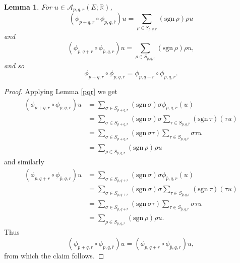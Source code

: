 \documentclass{article}
\newcommand{\sgn}{\mathrm{sgn}\,}
\newtheorem{lemma}[theorem]{Lemma}
\theoremstyle{definition}
\begin{document}
\begin{lemma}
For $u \in \mathscr{A}_{p,q,r}(E;\mathbb{R})$,
\[
(\phi_{p+q,r} \circ \phi_{p,q,\overline{r}})u = \sum_{\rho \in S_{p,q,r}} (\sgn \rho) \rho u
\]
and
\[
(\phi_{p,q+r} \circ \phi_{\overline{p},q,r})u = \sum_{\rho \in S_{p,q,r}} (\sgn \rho) \rho u,
\]
and so
\[
\phi_{p+q,r} \circ \phi_{p,q,\overline{r}} = \phi_{p,q+r} \circ \phi_{\overline{p},q,r}.
\]
\label{associative}
\end{lemma}
\begin{proof}
Applying Lemma \ref{pqr} we get
\begin{align*}
(\phi_{p+q,r} \circ \phi_{p,q,\overline{r}})u&=\sum_{\sigma \in S_{p+q,r}} (\sgn \sigma) \sigma \phi_{p,q,\overline{r}}(u)\\
&=\sum_{\sigma \in S_{p+q,r}} (\sgn \sigma) \sigma \sum_{\tau \in S_{p,q,\overline{r}}} (\sgn \tau)(\tau u)\\
&=\sum_{\sigma \in S_{p+q,r}} (\sgn \sigma \tau) \sum_{\tau \in S_{p,q,\overline{r}}} \sigma \tau u\\
&=\sum_{\rho \in S_{p,q,r}} (\sgn \rho) \rho u
\end{align*}
and similarly
\begin{align*}
(\phi_{p,q+r} \circ \phi_{\overline{p},q,r})u&=\sum_{\sigma \in S_{p,q+r}} (\sgn \sigma) \sigma \phi_{\overline{p},q,r}(u)\\
&=\sum_{\sigma \in S_{p,q+r}} (\sgn \sigma) \sigma \sum_{\tau \in S_{\overline{p},q,r}} (\sgn \tau)(\tau u)\\
&=\sum_{\sigma \in S_{p,q+r}} (\sgn \sigma \tau) \sum_{\tau \in S_{\overline{p},q,r}} \sigma \tau u\\
&=\sum_{\rho \in S_{p,q,r}} (\sgn \rho) \rho u.
\end{align*}
Thus
\[
(\phi_{p+q,r} \circ \phi_{p,q,\overline{r}})u=(\phi_{p,q+r} \circ \phi_{\overline{p},q,r})u,
\]
from which the claim follows.
\end{proof}
\end{document}
